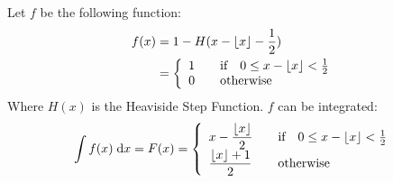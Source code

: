\documentclass[11pt,a4paper,oneside]{report}
\begin{document}
\author{Jonathan Dupuy}

Let $f$ be the following function:
\begin{align*}
	f(x) &= 1 - H(x - \lfloor x \rfloor - \frac{1}{2}) \\
	     &= \left\{
	\begin{array}{l l}
	1 & \quad \text{if} \quad 0 \leq x - \lfloor x \rfloor < \frac{1}{2} \\
	0 & \quad \text{otherwise}\\
	\end{array} \right.
\end{align*}
Where $H(x)$ is the Heaviside Step Function. 
$f$ can be integrated: 
\begin{equation*}
	\int f(x) \; \mathrm{d}x =  F(x) = 
	\left\{
	\begin{array}{l l}
	\displaystyle x - \frac{\lfloor x \rfloor}{2} & \quad \text{if} \quad 0 \leq x - \lfloor x \rfloor < \frac{1}{2} \\
	\displaystyle \frac{\lfloor x \rfloor + 1}{2} & \quad \text{otherwise}\\
	\end{array} \right.
\end{equation*}
\end{document}
